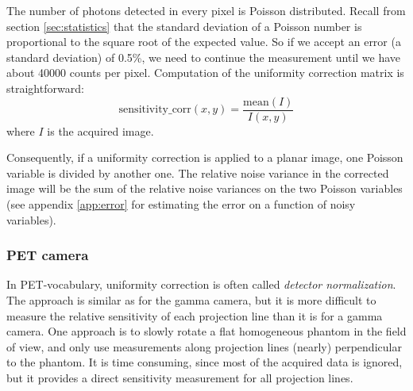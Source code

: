 \documentclass[11pt,oneside]{book}
\begin{document}
The number of photons detected in every pixel is Poisson distributed. Recall
from section \ref{sec:statistics} that the standard deviation of a Poisson
number is proportional to the square root of the expected value. So if we
accept an error (a standard deviation) of 0.5\%, we need to continue the
measurement until we have about 40000 counts per pixel. Computation of the
uniformity correction matrix is straightforward:
\begin{equation}
  \mbox{sensitivity\_corr}(x,y) = \frac{\mbox{mean}(I)}{I(x,y)}
\end{equation}
where $I$ is the acquired image.

Consequently, if a uniformity correction is applied to a planar image, one
Poisson variable is divided by another one. The relative noise variance in
the corrected image will be the sum of the relative noise variances on the
two Poisson variables (see appendix \ref{app:error} for estimating the error
on a function of noisy variables).

\subsubsection{PET camera} \label{sec:normalization1}
In PET-vocabulary, uniformity correction is often called {\em detector
normalization}. The approach is similar as for the gamma camera, but
it is more difficult to measure the relative sensitivity of each
projection line than it is for a gamma camera.  One approach is to
slowly rotate a flat homogeneous phantom in the field of view, and
only use measurements along projection lines (nearly) perpendicular to
the phantom. It is time consuming, since most of the acquired data is
ignored, but it provides a direct sensitivity measurement for all
projection lines.
\end{document}
